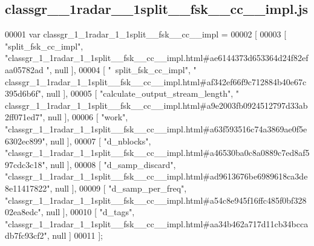 \subsection{classgr\+\_\+\_\+1radar\+\_\+\_\+1split\+\_\+\+\_\+fsk\+\_\+\+\_\+cc\+\_\+\+\_\+impl.\+js}
\label{classgr__1__1radar__1__1split____fsk____cc____impl_8js_source}

\begin{DoxyCode}
00001 var classgr_1_1radar_1_1split__fsk__cc__impl =
00002 [
00003     [ \textcolor{stringliteral}{"split\_fsk\_cc\_impl"}, \textcolor{stringliteral}{"classgr\_1\_1radar\_1\_1split\_\_fsk\_\_cc\_\_impl.html#ae6144373d653364d24f82efaa05782ad
      "}, null ],
00004     [ \textcolor{stringliteral}{"~split\_fsk\_cc\_impl"}, \textcolor{stringliteral}{"
      classgr\_1\_1radar\_1\_1split\_\_fsk\_\_cc\_\_impl.html#af342ef66f9c712884b40e67c395d6b6f"}, null ],
00005     [ \textcolor{stringliteral}{"calculate\_output\_stream\_length"}, \textcolor{stringliteral}{"
      classgr\_1\_1radar\_1\_1split\_\_fsk\_\_cc\_\_impl.html#a9e2003fb0924512797d33ab2ff071ed7"}, null ],
00006     [ \textcolor{stringliteral}{"work"}, \textcolor{stringliteral}{"classgr\_1\_1radar\_1\_1split\_\_fsk\_\_cc\_\_impl.html#a63f593516c74a3869ae0f5e6302ec899"}, null ],
00007     [ \textcolor{stringliteral}{"d\_nblocks"}, \textcolor{stringliteral}{"classgr\_1\_1radar\_1\_1split\_\_fsk\_\_cc\_\_impl.html#a46530ba0c8a0889c7ed8af597cdc3c18"}, null 
      ],
00008     [ \textcolor{stringliteral}{"d\_samp\_discard"}, \textcolor{stringliteral}{"classgr\_1\_1radar\_1\_1split\_\_fsk\_\_cc\_\_impl.html#ad9613676be6989618ca3de8e11417822"}, 
      null ],
00009     [ \textcolor{stringliteral}{"d\_samp\_per\_freq"}, \textcolor{stringliteral}{"classgr\_1\_1radar\_1\_1split\_\_fsk\_\_cc\_\_impl.html#a54c8e945f16ffc485f0bf32802ea8edc"},
       null ],
00010     [ \textcolor{stringliteral}{"d\_tags"}, \textcolor{stringliteral}{"classgr\_1\_1radar\_1\_1split\_\_fsk\_\_cc\_\_impl.html#aa34b462a717d11cb34bccadb7fc93cf2"}, null ]
00011 ];
\end{DoxyCode}

